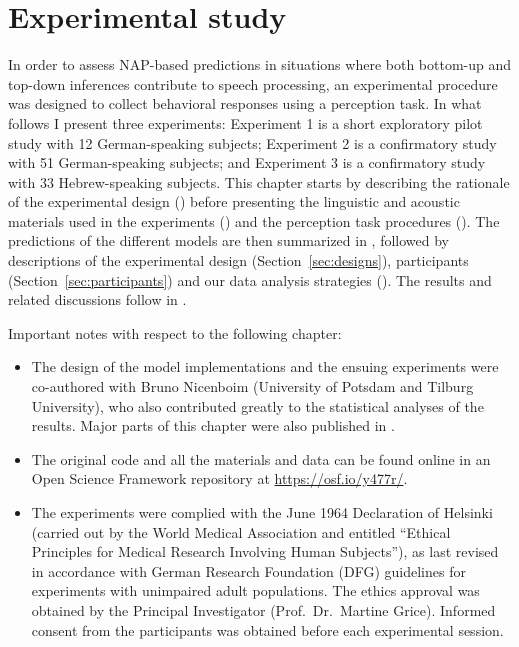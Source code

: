 \chapter{Experimental study}\label{sec:experiments}

In order to assess NAP-based predictions in situations where both bottom-up and top-down inferences contribute to speech processing, an experimental procedure was designed to collect behavioral responses using a perception task.
In what follows I present three experiments:
Experiment 1 is a short exploratory pilot study with 12 German-speaking subjects;
Experiment 2 is a confirmatory study with 51 German-speaking subjects;
and Experiment 3 is a confirmatory study with 33 Hebrew-speaking subjects.
This chapter starts by describing the rationale of the experimental design () before presenting the linguistic and acoustic materials used in the experiments () and the perception task procedures ().
The predictions of the different models are then summarized in , followed by descriptions of the experimental design (Section~\ref{sec:designs}), participants (Section~\ref{sec:participants}) and our data analysis strategies (). The results and related discussions follow in .

Important notes with respect to the following chapter:

\begin{itemize}
\item
  The design of the model implementations and the ensuing experiments were co-authored with Bruno Nicenboim (University of Potsdam and Tilburg University), who also contributed greatly to the statistical analyses of the results. Major parts of this chapter were also published in \citet{albert2022modeling}.
\item
  The original code and all the materials and data can be found online in an Open Science Framework repository at \url{https://osf.io/y477r/}.
\item
  The experiments were complied with the June 1964 Declaration of Helsinki (carried out by the World Medical Association and entitled \enquote{Ethical Principles for Medical Research Involving Human Subjects}), as last revised in accordance with German Research Foundation (DFG) guidelines for experiments with unimpaired adult populations. The ethics approval was obtained by the Principal Investigator (Prof.~Dr.~Martine Grice). Informed consent from the participants was obtained before each experimental session.
\end{itemize}


